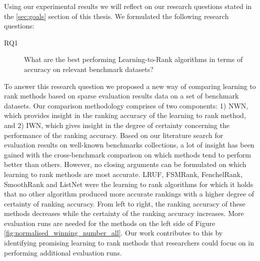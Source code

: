 Using our experimental results we will reflect on our research questions stated in the \ref{sec:goals} section of this thesis. We formulated the following research questions:
\begin{description}
\item[RQ1] What are the best performing Learning-to-Rank algorithms in terms of accuracy on relevant benchmark datasets?
\end{description}
To answer this research question we proposed a new way of comparing learning to rank methods based on sparse evaluation results data on a set of benchmark datasets. Our comparison methodology comprises of two components: 1) NWN, which provides insight in the ranking accuracy of the learning to rank method, and 2) IWN, which gives insight in the degree of certainty concerning the performance of the ranking accuracy. Based on our literature search for evaluation results on well-known benchmarks collections, a lot of insight has been gained with the cross-benchmark comparison on which methods tend to perform better than others. However, no closing arguments can be formulated on which learning to rank methods are most accurate. LRUF, FSMRank, FenchelRank, SmoothRank and ListNet were the learning to rank algorithms for which it holds that no other algorithm produced more accurate rankings with a higher degree of certainty of ranking accuracy. From left to right, the ranking accuracy of these methods decreases while the certainty of the ranking accuracy increases. More evaluation runs are needed for the methods on the left side of Figure \ref{fig:normalised_winning_number_all}. Our work contributes to this by identifying promising learning to rank methods that researchers could focus on in performing additional evaluation runs.

